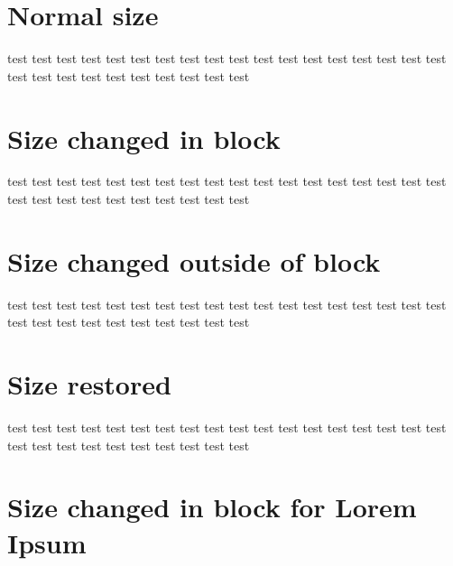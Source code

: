 \documentclass{scrartcl}
\begin{document}
\section{Normal size}

test test test test test test test test test test test test test test test test test test test test test test test test test test test test 

\section{Size changed in block}

  {\fontsize{15}{20}\selectfont
test test test test test test test test test test test test test test test test test test test test test test test test test test test test 
  }

\section{Size changed outside of block}

  \fontsize{15}{20}\selectfont
test test test test test test test test test test test test test test test test test test test test test test test test test test test test 

\section{Size restored}

\normalsize
test test test test test test test test test test test test test test test test test test test test test test test test test test test test 

\section{Size changed in block for Lorem Ipsum}

  {\fontsize{15}{20}\selectfont\lipsum[1]}
  
\end{document}
